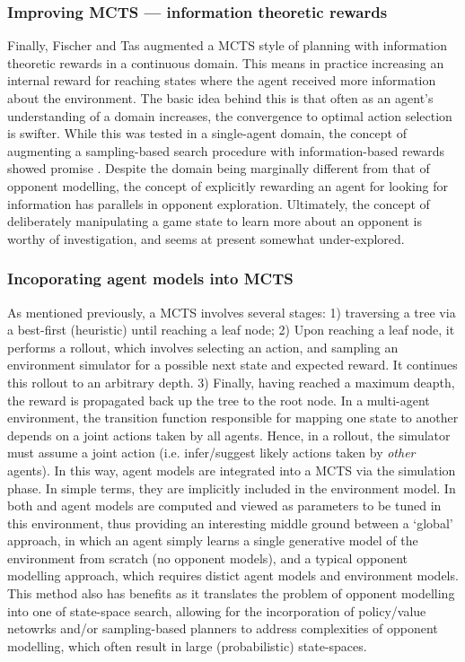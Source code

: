 \subsubsection{Improving MCTS --- information theoretic rewards}
Finally, Fischer and Tas augmented a MCTS style of planning with information theoretic rewards in a continuous domain. This means in practice increasing an internal reward for reaching states where the agent received more information about the environment. The basic idea behind this is that often as an agent's understanding of a domain increases, the convergence to optimal action selection is swifter. While this was tested in a single-agent domain, the concept of augmenting a sampling-based search procedure with information-based rewards showed promise \cite{Fischer2020}. Despite the domain being marginally different from that of opponent modelling, the concept of explicitly rewarding an agent for looking for information has parallels in opponent exploration. Ultimately, the concept of deliberately manipulating a game state to learn more about an opponent is worthy of investigation, and seems at present somewhat under-explored.

\subsubsection{Incoporating agent models into MCTS}
As mentioned previously, a MCTS involves several stages: 1) traversing a tree via a best-first (heuristic) until reaching a leaf node; 2) Upon reaching a leaf node, it performs a rollout, which involves selecting an action, and sampling an environment simulator for a possible next state and expected reward. It continues this rollout to an arbitrary depth. 3) Finally, having reached a maximum deapth, the reward is propagated back up the tree to the root node.
\newline \newline 
In a multi-agent environment, the transition function responsible for mapping one state to another depends on a joint actions taken by all agents. Hence, in a rollout, the simulator must assume a joint action (i.e. infer/suggest likely actions taken by \textit{other} agents). In this way, agent models are integrated into a MCTS via the simulation phase. In simple terms, they are implicitly included in the environment model. In both \cite{Hayashi_et_al2020} and \cite{Albrecht_stone_2019} agent models are computed and viewed as parameters to be tuned in this environment, thus providing an interesting middle ground between a `global' approach, in which an agent simply learns a single generative model of  the environment from scratch (no opponent models), and a typical opponent modelling approach, which requires distict agent models and environment models.
\newline \newline
This method also has benefits as it translates the problem of opponent modelling into one of state-space search, allowing for the incorporation of policy/value netowrks and/or sampling-based planners to address complexities of opponent modelling, which often result in large (probabilistic) state-spaces.